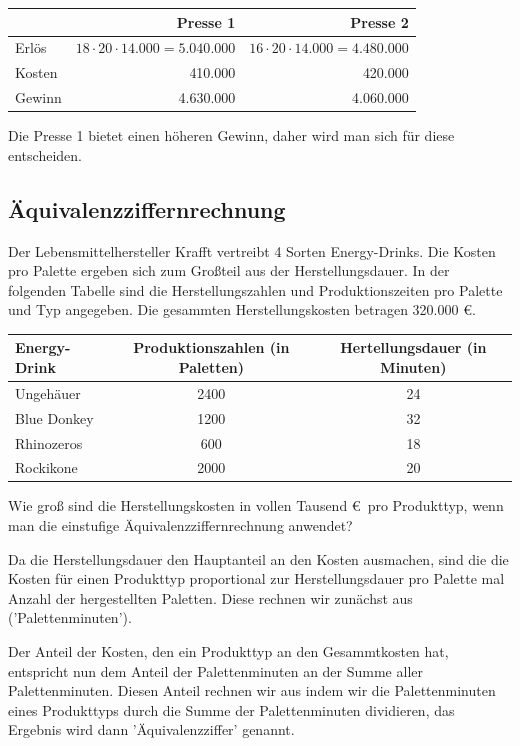 \documentclass[11pt, a4paper]{article}
\begin{document}
\begin{enumerate}
		\vspace{\baselineskip}
		\begin{tabular}{l|r|r}
			& Presse 1 & Presse 2 \\ \hline
			Erlös & $18 \cdot 20 \cdot 14.000 =5.040.000$ & $16 \cdot 20 \cdot 14.000 = 4.480.000$ \\
			Kosten & 410.000 & 420.000 \\ \hline
			Gewinn & 4.630.000 & 4.060.000
		\end{tabular}
		
		\vspace{\baselineskip}
		Die Presse 1 bietet einen höheren Gewinn, daher wird man sich für diese entscheiden.
\end{enumerate}

\subsection{Äquivalenzziffernrechnung}
Der Lebensmittelhersteller Krafft vertreibt 4 Sorten Energy-Drinks. Die Kosten pro Palette ergeben sich zum Großteil aus der Herstellungsdauer. In der folgenden Tabelle sind die Herstellungszahlen und Produktionszeiten pro Palette und Typ angegeben. Die gesammten Herstellungskosten betragen 320.000 \euro.

\begin{tabular}{lcc}
	Energy-Drink & Produktionszahlen (in Paletten) & Hertellungsdauer (in Minuten) \\ \hline
	Ungehäuer & 2400 & 24 \\
	Blue Donkey & 1200 & 32 \\
	Rhinozeros & 600 & 18 \\
	Rockikone & 2000 & 20
\end{tabular}

\vspace{\baselineskip}
Wie groß sind die Herstellungskosten in vollen Tausend \euro \ pro Produkttyp, wenn man die einstufige Äquivalenzziffernrechnung anwendet?

\vspace{\baselineskip}
Da die Herstellungsdauer den Hauptanteil an den Kosten ausmachen, sind die die Kosten für einen Produkttyp proportional zur Herstellungsdauer pro Palette mal Anzahl der hergestellten Paletten. Diese rechnen wir zunächst aus ('Palettenminuten').

Der Anteil der Kosten, den ein Produkttyp an den Gesammtkosten hat, entspricht nun dem Anteil der Palettenminuten an der Summe aller Palettenminuten. Diesen Anteil rechnen wir aus indem wir die Palettenminuten eines Produkttyps durch die Summe der Palettenminuten dividieren, das Ergebnis wird dann 'Äquivalenzziffer' genannt.
\end{document}
